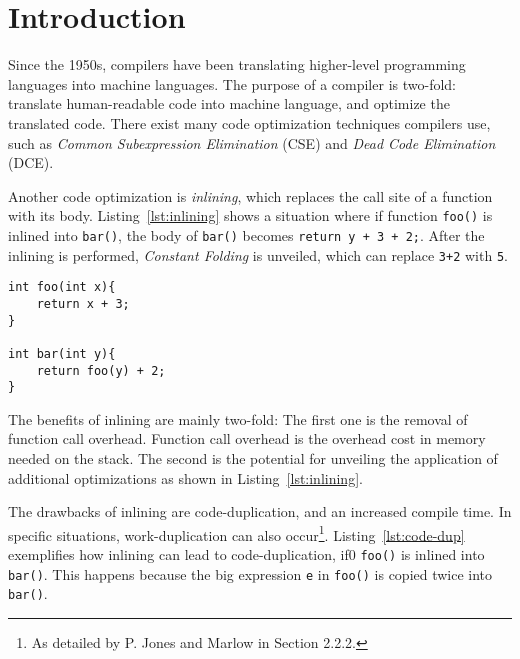 
\section{Introduction}
\label{introduction}

Since the 1950s, compilers have been translating higher-level programming
languages into machine languages. The purpose of a compiler is two-fold:
translate human-readable code into machine language, and optimize the translated
code. There exist many code optimization techniques compilers use, such as
\textit{Common Subexpression Elimination} (CSE) and \textit{Dead Code
Elimination} (DCE).

Another code optimization is \textit{inlining}, which replaces the call site of
a function with its body. Listing~\ref{lst:inlining} shows a situation where
if function \lstinline!foo()! is inlined into \lstinline!bar()!, the body of
\lstinline!bar()! becomes \lstinline!return y + 3 + 2;!. After the inlining is
performed, \textit{Constant Folding} is unveiled, which can replace
\lstinline!3+2! with \lstinline!5!.

\begin{centering}
	\noindent\begin{minipage}{\textwidth}
		\begin{CenteredBox}
		\begin{lstlisting}[style=global_customcpp]
int foo(int x){
	return x + 3;
}

int bar(int y){
	return foo(y) + 2;
}
		\end{lstlisting}
		\end{CenteredBox}
	\end{minipage}
	\label{lst:inlining}
\end{centering}

The benefits of inlining are mainly two-fold: The first one is the removal of
function call overhead. Function call overhead is the overhead cost in memory
needed on the stack. The second is the potential for unveiling the application
of additional optimizations as shown in Listing~\ref{lst:inlining}.

The drawbacks of inlining are code-duplication, and an increased compile time.
In specific situations, work-duplication can also occur\footnote{As detailed by
P. Jones and Marlow in Section 2.2.2\cite{GHCPaper}.}. Listing~\ref{lst:code-dup}
exemplifies how inlining can lead to code-duplication, if0
\lstinline!foo()! is inlined into \lstinline!bar()!. This happens because the
big expression \lstinline!e! in \lstinline!foo()! is copied twice into
\lstinline!bar()!.

